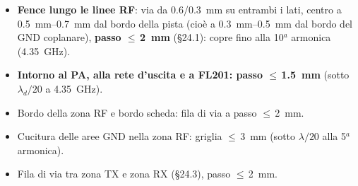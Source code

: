 \documentclass[a4paper,10pt]{article}
\newcounter{regola}
\begin{document}
\begin{regola}
\begin{itemize}
\item \textbf{Fence lungo le linee RF}: via da \SI{0.6}{}/\SI{0.3}{mm} su entrambi i lati, centro a
      \SIrange{0.5}{0.7}{mm} dal bordo della pista (cioè a \SIrange{0.3}{0.5}{mm} dal bordo del GND
      coplanare), \textbf{passo $\le$\,\SI{2}{mm}} (\S24.1): copre fino alla 10$^a$ armonica
      (\SI{4.35}{GHz}).
\item \textbf{Intorno al PA, alla rete d'uscita e a FL201: passo $\le$\,\SI{1.5}{mm}} (sotto $\lambda_d/20$ a
      \SI{4.35}{GHz}).
\item Bordo della zona RF e bordo scheda: fila di via a passo $\le$\,\SI{2}{mm}.
\item Cucitura delle aree GND nella zona RF: griglia $\le$\,\SI{3}{mm} (sotto $\lambda/20$ alla 5$^a$
      armonica).
\item Fila di via tra zona TX e zona RX (\S24.3), passo $\le$\,\SI{2}{mm}.
\end{itemize}
\end{regola}

\begin{center}
\end{center}
\end{document}
